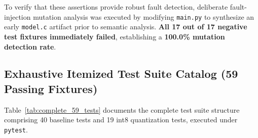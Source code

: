 \documentclass[11pt,a4paper]{article}
\begin{document}
To verify that these assertions provide robust fault detection, deliberate fault-injection mutation analysis was executed by modifying \texttt{main.py} to synthesize an early \texttt{model.c} artifact prior to semantic analysis. \textbf{All 17 out of 17 negative test fixtures immediately failed}, establishing a \textbf{100.0\% mutation detection rate}.


\subsection{Exhaustive Itemized Test Suite Catalog (59 Passing Fixtures)}
\label{sec:full_test_catalog}
Table~\ref{tab:complete_59_tests} documents the complete test suite structure comprising 40 baseline tests and 19 int8 quantization tests, executed under \texttt{pytest}.
\end{document}
